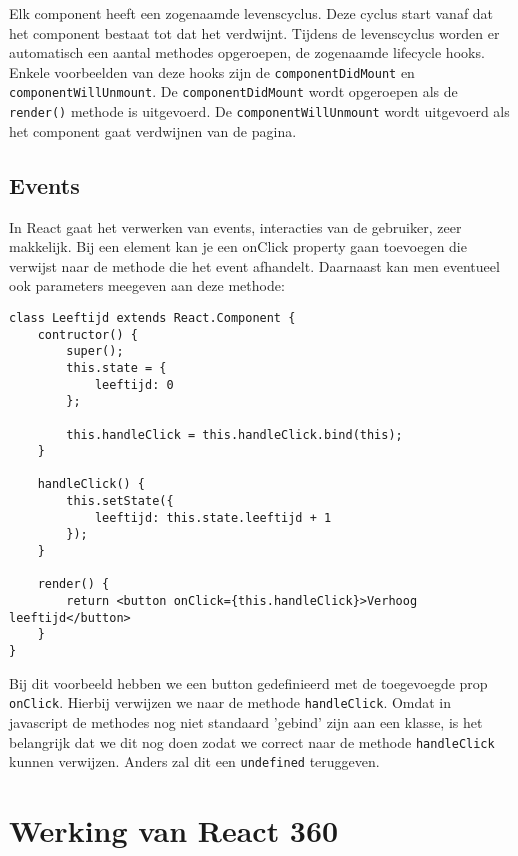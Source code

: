 Elk component heeft een zogenaamde levenscyclus. Deze cyclus start vanaf dat het component bestaat tot dat het verdwijnt. Tijdens de levenscyclus worden er automatisch een aantal methodes opgeroepen, de zogenaamde lifecycle hooks. Enkele voorbeelden van deze hooks zijn de \lstinline[basicstyle=\ttfamily\color{red}]|componentDidMount| en \lstinline[basicstyle=\ttfamily\color{red}]|componentWillUnmount|. De \lstinline[basicstyle=\ttfamily\color{red}]|componentDidMount| wordt opgeroepen als de \lstinline[basicstyle=\ttfamily\color{red}]|render()| methode is uitgevoerd. De \lstinline[basicstyle=\ttfamily\color{red}]|componentWillUnmount| wordt uitgevoerd als het component gaat verdwijnen van de pagina.

\subsection{Events}
\label{subsec:events}
In React gaat het verwerken van events, interacties van de gebruiker, zeer makkelijk. Bij een element kan je een onClick property gaan toevoegen die verwijst naar de methode die het event afhandelt. Daarnaast kan men eventueel ook parameters meegeven aan deze methode:

\begin{lstlisting}[frame=single, caption=Een event afhandelen]
class Leeftijd extends React.Component {
	contructor() {
		super();
		this.state = {
			leeftijd: 0
		};
		
		this.handleClick = this.handleClick.bind(this);
	}
	
	handleClick() {
		this.setState({
			leeftijd: this.state.leeftijd + 1
		});
	}

	render() {
		return <button onClick={this.handleClick}>Verhoog leeftijd</button>
	}
}
\end{lstlisting}

Bij dit voorbeeld hebben we een button gedefinieerd met de toegevoegde prop \lstinline[basicstyle=\ttfamily\color{red}]|onClick|. Hierbij verwijzen we naar de methode \lstinline[basicstyle=\ttfamily\color{red}]|handleClick|. Omdat in javascript de methodes nog niet standaard 'gebind' zijn aan een klasse, is het belangrijk dat we dit nog doen zodat we correct naar de methode \lstinline[basicstyle=\ttfamily\color{red}]|handleClick| kunnen verwijzen. Anders zal dit een \lstinline[basicstyle=\ttfamily\color{red}]|undefined| teruggeven.

\section{Werking van React 360}
\label{sec:werking-react360}

